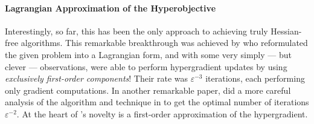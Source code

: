 
\paragraph{Lagrangian Approximation of the Hyperobjective}
Interestingly, so far, this has been the only approach to achieving truly Hessian-free algorithms.  This remarkable breakthrough was achieved by \cite{kwon2023fully} who reformulated the given problem into a Lagrangian form, and with some very simply --- but  clever --- observations, were able to perform hypergradient updates by using \emph{exclusively first-order components}! Their rate was $\varepsilon^{-3}$ iterations, each performing only gradient computations.  In another remarkable paper, \cite{chen2023near} did a more careful analysis of the algorithm and technique in \cite{kwon2023fully} to get the optimal number of iterations $\varepsilon^{-2}$. At the heart of \cite{kwon2023fully}'s novelty is a first-order approximation of the hypergradient. 

